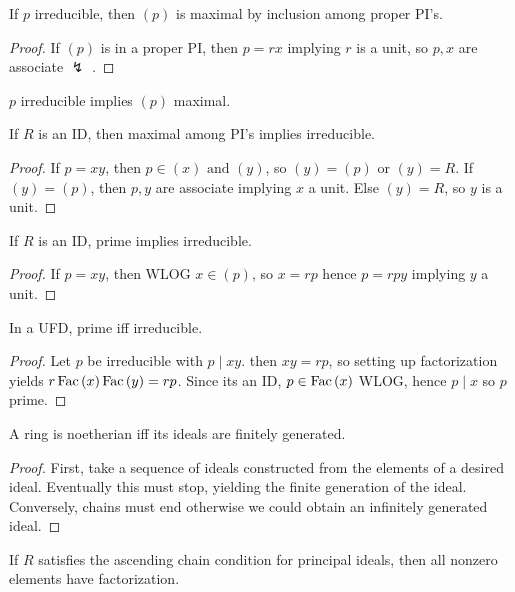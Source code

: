 \begin{theorem}
If \(p\) irreducible, then \( \left( p \right) \) is maximal by inclusion among proper PI's.
\end{theorem}
\begin{proof}
	If \(\left( p \right) \) is in a proper PI, then \(p = rx\) implying \(r\) is a unit, so \(p, x\) are associate \(\lightning\) .
\end{proof}
\begin{corollary}
	\(p\) irreducible implies \(\left( p \right) \) maximal.
\end{corollary}
\begin{theorem}
	If \(R\) is an ID, then maximal among PI's implies irreducible.
\end{theorem}
\begin{proof}
	If \(p = xy\), then \(p \in \left( x \right) \text{ and } \left( y \right) \), so \(\left( y \right)  = \left( p \right) \) or \(\left( y \right)  = R\). If \(\left( y \right)  = \left( p \right) \), then \(p, y\) are associate implying \(x\) a unit. Else \( \left( y \right)  = R\), so \(y\) is a unit.
\end{proof}
\begin{theorem}
	If \(R\) is an ID, prime implies irreducible.
\end{theorem}
\begin{proof}
	If \(p = xy\), then WLOG \(x \in \left( p \right) \), so \(x = rp\) hence \(p = rpy\) implying \(y\) a unit.
\end{proof}
\begin{theorem}
	In a UFD, prime iff irreducible.
\end{theorem}
\begin{proof}
Let \(p\) be irreducible with \(p \mid xy\). then \(xy = rp\), so setting up factorization yields \(r\operatorname{Fac}\left( x \right) \operatorname{Fac}\left( y \right) = rp \). Since its an ID, \(p \in \operatorname{Fac}\left( x \right) \) WLOG, hence \(p \mid x\) so \(p\) prime.
\end{proof}
\begin{theorem}
	A ring is noetherian iff its ideals are finitely generated.
\end{theorem}
\begin{proof}
	First, take a sequence of ideals constructed from the elements of a desired ideal. Eventually this must stop, yielding the finite generation of the ideal. Conversely, chains must end otherwise we could obtain an infinitely generated ideal.
\end{proof}
\begin{theorem}
	If \(R\) satisfies the ascending chain condition for principal ideals, then all nonzero elements have factorization.
\end{theorem}
